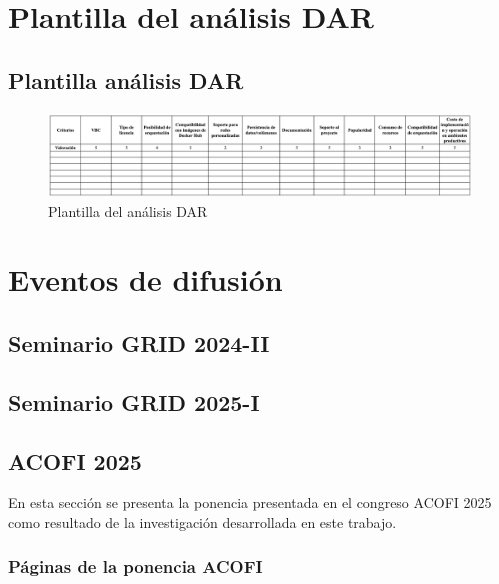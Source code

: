 \FloatBarrier\chapter{Plantilla del análisis DAR}
\section{Plantilla análisis DAR}

\begin{figure}[H]
    \centering
    \includegraphics[width=\textwidth,height=0.85\textheight,keepaspectratio]{apendices/plantilla-DAR.png}
    \caption{Plantilla del análisis DAR}\label{fig:tabla-plantilla-dar}
\end{figure}
\FloatBarrier\chapter{Eventos de difusión}
\section{Seminario GRID 2024-II}


\section{Seminario GRID 2025-I}

\section{ACOFI 2025}

En esta sección se presenta la ponencia presentada en el congreso ACOFI 2025 como resultado de la investigación desarrollada en este trabajo.

\subsection{Páginas de la ponencia ACOFI}

